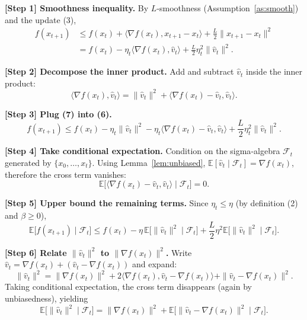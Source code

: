 \documentclass{article}
\newcommand{\E}{\mathbb{E}}
\begin{document}
\bigskip
\noindent\textbf{[Step 1] Smoothness inequality.}  
By $L$‑smoothness (Assumption~\ref{as:smooth}) and the update (3),
\[
\begin{aligned}
f(x_{t+1})
&\le f(x_{t}) + \langle\nabla f(x_{t}),x_{t+1}-x_{t}\rangle
      +\frac{L}{2}\|x_{t+1}-x_{t}\|^{2} \\
&= f(x_{t}) -\eta_{t}\langle\nabla f(x_{t}),\widehat v_{t}\rangle
      +\frac{L}{2}\eta_{t}^{2}\|\widehat v_{t}\|^{2}. \tag{6}
\end{aligned}
\]

\noindent\textbf{[Step 2] Decompose the inner product.}  
Add and subtract $\widehat v_{t}$ inside the inner product:
\[
\langle\nabla f(x_{t}),\widehat v_{t}\rangle
= \|\widehat v_{t}\|^{2}
  +\langle\nabla f(x_{t})-\widehat v_{t},\widehat v_{t}\rangle. \tag{7}
\]

\noindent\textbf{[Step 3] Plug (7) into (6).}
\[
f(x_{t+1})
\le f(x_{t}) -\eta_{t}\|\widehat v_{t}\|^{2}
      -\eta_{t}\langle\nabla f(x_{t})-\widehat v_{t},\widehat v_{t}\rangle
      +\frac{L}{2}\eta_{t}^{2}\|\widehat v_{t}\|^{2}. \tag{8}
\]

\noindent\textbf{[Step 4] Take conditional expectation.}  
Condition on the sigma‑algebra $\mathcal{F}_{t}$ generated by $\{x_{0},\dots ,x_{t}\}$.  
Using Lemma~\ref{lem:unbiased}, $\E[\widehat v_{t}\mid\mathcal{F}_{t}]=\nabla f(x_{t})$, therefore the cross term vanishes:
\[
\E\!\bigl[\langle\nabla f(x_{t})-\widehat v_{t},\widehat v_{t}\rangle\mid\mathcal{F}_{t}\bigr]=0. \tag{9}
\]

\noindent\textbf{[Step 5] Upper bound the remaining terms.}
Since $\eta_{t}\le\eta$ (by definition (2) and $\beta\ge0$),
\[
\E\!\bigl[f(x_{t+1})\mid\mathcal{F}_{t}\bigr]
\le f(x_{t}) -\eta\,\E\!\bigl[\|\widehat v_{t}\|^{2}\mid\mathcal{F}_{t}\bigr]
    +\frac{L}{2}\eta^{2}\E\!\bigl[\|\widehat v_{t}\|^{2}\mid\mathcal{F}_{t}\bigr]. \tag{10}
\]

\noindent\textbf{[Step 6] Relate $\|\widehat v_{t}\|^{2}$ to $\|\nabla f(x_{t})\|^{2}$.}  
Write $\widehat v_{t}= \nabla f(x_{t}) + (\widehat v_{t}-\nabla f(x_{t}))$ and expand:
\[
\|\widehat v_{t}\|^{2}
= \|\nabla f(x_{t})\|^{2}
  +2\langle\nabla f(x_{t}),\widehat v_{t}-\nabla f(x_{t})\rangle
  +\|\widehat v_{t}-\nabla f(x_{t})\|^{2}.
\]
Taking conditional expectation, the cross term disappears (again by unbiasedness), yielding
\[
\E\!\bigl[\|\widehat v_{t}\|^{2}\mid\mathcal{F}_{t}\bigr]
= \|\nabla f(x_{t})\|^{2}
  +\E\!\bigl[\|\widehat v_{t}-\nabla f(x_{t})\|^{2}\mid\mathcal{F}_{t}\bigr]. \tag{11}
\]
\end{document}
